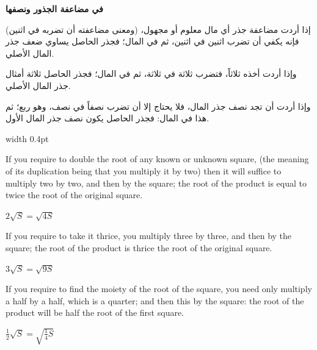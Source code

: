 \documentclass[11pt,a4paper,openany,oneside]{book}
\begin{document}
\noindent\begin{minipage}[t]{0.48\textwidth}
\raggedleft

\begin{Arabic}
\textbf{في مضاعفة الجذور ونصفها}

إذا أردت مضاعفة جذر أي مال معلوم أو مجهول، (ومعنى مضاعفته أن تضربه في اثنين) فإنه يكفي أن تضرب اثنين في اثنين، ثم في المال؛ فجذر الحاصل يساوي ضعف جذر المال الأصلي.

وإذا أردت أخذه ثلاثاً، فتضرب ثلاثة في ثلاثة، ثم في المال؛ فجذر الحاصل ثلاثة أمثال جذر المال الأصلي.

وإذا أردت أن تجد نصف جذر المال، فلا يحتاج إلا أن تضرب نصفاً في نصف، وهو ربع؛ ثم هذا في المال: فجذر الحاصل يكون نصف جذر المال الأول.
\end{Arabic}

\end{minipage}%
\hfill\vrule width 0.4pt\hfill
\begin{minipage}[t]{0.48\textwidth}
\raggedright

If you require to double the root of any known or unknown square, (the meaning of its duplication being that you multiply it by two) then it will suffice to multiply two by two, and then by the square; the root of the product is equal to twice the root of the original square.

$2\sqrt{S} = \sqrt{4S}$

\vspace{0.2cm}

If you require to take it thrice, you multiply three by three, and then by the square; the root of the product is thrice the root of the original square.

$3\sqrt{S} = \sqrt{9S}$

\vspace{0.2cm}

If you require to find the moiety of the root of the square, you need only multiply a half by a half, which is a quarter; and then this by the square: the root of the product will be half the root of the first square.

$\tfrac{1}{2}\sqrt{S} = \sqrt{\tfrac{1}{4}S}$

\end{minipage}
\vspace{0.3cm}

\newpage

\end{document}

